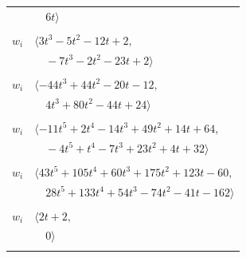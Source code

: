 \documentclass[11pt]{article}
\begin{document}
\begin{longtable}{@{}ll@{}}
 & $\quad 6t\rangle$\\
\addlinespace[2pt]
\multicolumn{2}{@{}p{0.97\textwidth}@{}}{$i=5$, $D_i=1$, $\rho_{ij}$: $1{:}2, \allowbreak 14{:}1, \allowbreak 32{:}2, \allowbreak 34{:}2, \allowbreak 35{:}2$}\\
$w_i$ & $\langle 3t^{3}-5t^{2}-12t+2,$\\
 & $\quad -7t^{3}-2t^{2}-23t+2\rangle$\\
\addlinespace[2pt]
\multicolumn{2}{@{}p{0.97\textwidth}@{}}{$i=6$, $D_i=1$, $\rho_{ij}$: $8{:}1, \allowbreak 18{:}2, \allowbreak 26{:}2, \allowbreak 37{:}2, \allowbreak 42{:}2, \allowbreak 43{:}1$}\\
$w_i$ & $\langle -44t^{3}+44t^{2}-20t-12,$\\
 & $\quad 4t^{3}+80t^{2}-44t+24\rangle$\\
\addlinespace[2pt]
\multicolumn{2}{@{}p{0.97\textwidth}@{}}{$i=7$, $D_i=1$, $\rho_{ij}$: $0{:}1, \allowbreak 1{:}2, \allowbreak 3{:}1, \allowbreak 4{:}1, \allowbreak 9{:}2, \allowbreak 17{:}1, \allowbreak 18{:}1, \allowbreak 19{:}1, \allowbreak 21{:}2, \allowbreak 24{:}1, \allowbreak 25{:}1, \allowbreak 31{:}1, \allowbreak 37{:}1, \allowbreak 38{:}1$}\\
$w_i$ & $\langle -11t^{5}+2t^{4}-14t^{3}+49t^{2}+14t+64,$\\
 & $\quad -4t^{5}+t^{4}-7t^{3}+23t^{2}+4t+32\rangle$\\
\addlinespace[2pt]
\multicolumn{2}{@{}p{0.97\textwidth}@{}}{$i=8$, $D_i=1$, $\rho_{ij}$: $0{:}1, \allowbreak 2{:}1, \allowbreak 6{:}2, \allowbreak 9{:}2, \allowbreak 13{:}1, \allowbreak 18{:}1, \allowbreak 24{:}2, \allowbreak 26{:}2, \allowbreak 34{:}1, \allowbreak 39{:}1, \allowbreak 40{:}1, \allowbreak 46{:}2$}\\
$w_i$ & $\langle 43t^{5}+105t^{4}+60t^{3}+175t^{2}+123t-60,$\\
 & $\quad 28t^{5}+133t^{4}+54t^{3}-74t^{2}-41t-162\rangle$\\
\addlinespace[2pt]
\multicolumn{2}{@{}p{0.97\textwidth}@{}}{$i=9$, $D_i=1$, $\rho_{ij}$: $7{:}1, \allowbreak 8{:}1, \allowbreak 25{:}1, \allowbreak 41{:}1$}\\
$w_i$ & $\langle 2t+2,$\\
 & $\quad 0\rangle$\\
\addlinespace[2pt]
\multicolumn{2}{@{}p{0.97\textwidth}@{}}{$i=10$, $D_i=1$, $\rho_{ij}$: $4{:}2, \allowbreak 19{:}2, \allowbreak 28{:}1, \allowbreak 29{:}2, \allowbreak 35{:}1, \allowbreak 39{:}2, \allowbreak 40{:}2, \allowbreak 42{:}1, \allowbreak 44{:}2$}\\

\end{longtable}
\end{document}

